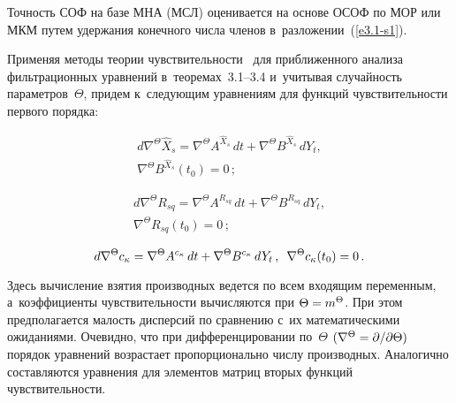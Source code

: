 \begin{multicols}{2}
Точность СОФ на базе МНА (МСЛ) оценивается на основе ОСОФ по МОР или МКМ путем 
удержания конечного числа членов в~разложении~(\ref{e3.1-s1}).

Применяя методы теории чувствительности~\cite{9-s1, 10-s1} 
для приближенного анализа фильтрационных уравнений в~теоремах~3.1--3.4 и~учитывая 
случайность параметров~$\Theta$, придем к~следующим уравнениям для функций 
чувствительности первого порядка:

\vspace*{-4pt}

\noindent
\begin{multline*}
d\nabla^\Theta \hat X_s = \nabla^\Theta A^{\hat X_s} \,dt + 
\nabla^\Theta B^{\hat X_s}\,dY_t,\\
\nabla^\Theta B^{\hat X_s}(t_0) =0\,; %
\end{multline*}

\vspace*{-14pt}

\noindent
\begin{multline*}
d\nabla^\Theta R_{sq} = \nabla^\Theta A^{R_{sq}}\, dt + \nabla^\Theta B^{R_{sq}}\,dY_t, \\
\nabla^\Theta R_{sq}(t_0) =0\,; %
\end{multline*}

\vspace*{-3pt}

\noindent
\begin{equation*}
d\nabla^\Theta c_{\kappa} = \nabla^\Theta A^{c_\kappa}\, dt + \nabla^\Theta 
B^{c_\kappa}\,dY_t\,,\enskip \nabla^\Theta c_\kappa(t_0) =0\,.
\end{equation*}

\columnbreak

\noindent
Здесь вычисление взятия производных ведется по всем входящим переменным, 
а~коэффициенты чувствительности вычисляются при  $\Theta\hm=m^\Theta$. При этом 
предполагается малость дисперсий по сравнению с~их математическими ожиданиями. 
Очевидно, что при дифференцировании по~$\Theta$ $(\nabla^\Theta \hm= \prt /\prt\Theta)$
порядок уравнений возрастает пропорционально числу производных. Аналогично составляются 
уравнения для элементов матриц вторых функций чувствительности.


\end{multicols}
